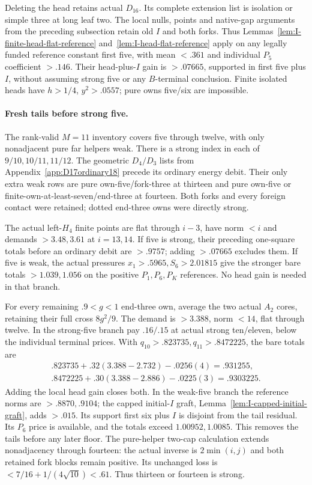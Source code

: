 \documentclass[11pt]{article}
\theoremstyle{definition}
\theoremstyle{remark}
\begin{document}
Deleting the head retains actual \(D_{16}\). Its complete extension
list is isolation or simple three at long leaf two. The local nulls,
points and native-gap arguments from the preceding subsection retain
old \(I\) and both forks. Thus Lemmas~\ref{lem:I-finite-head-flat-reference}
and~\ref{lem:I-head-flat-reference} apply on any legally funded
reference constant first five, with mean \(<.361\) and individual
\(P_5\) coefficient \(>.146\). Their head-plus-\(I\) gain is
\(>.07665\), supported in first five plus \(I\), without assuming
strong five or any \(B\)-terminal conclusion. Finite isolated heads
have \(h>1/4\), \(y^2>.0557\); pure owns five/six are impossible.

\paragraph{Fresh tails before strong five.}
The rank-valid \(M=11\) inventory covers five through twelve, with
only nonadjacent pure far helpers weak. There is a strong index in
each of \(9/10,10/11,11/12\). The geometric \(D_4/D_3\) lists
from Appendix~\ref{app:D17ordinary18} precede its ordinary energy
debit. Their only extra weak rows are pure own-five/fork-three at
thirteen and pure own-five or finite-own-at-least-seven/end-three
at fourteen. Both forks and every foreign contact were retained;
dotted end-three owns were directly strong.

The actual left-\(H_4\) finite points are flat through \(i-3\),
have norm \(<i\) and demands \(>3.48,3.61\) at \(i=13,14\).
If five is strong, their preceding one-square totals before an
ordinary debit are \(>.9757\); adding \(>.07665\) excludes them.
If five is weak, the actual pressures \(x_1>.5965,S_6>2.01815\)
give the stronger bare totals \(>1.039,1.056\) on the positive
\(P_1,P_6,P_K\) references. No head gain is needed in that branch.

For every remaining \(.9<g<1\) end-three own, average the two
actual \(A_2\) cores, retaining their full cross \(8g^2/9\).
The demand is \(>3.388\), norm \(<14\), flat through twelve.
In the strong-five branch pay \(.16/.15\) at actual strong ten/eleven,
below the individual terminal prices. With
\(q_{10}>.823735,q_{11}>.8472225\), the bare totals are
\[
\begin{gathered}
 .823735+.32(3.388-2.732)-.0256(4)=.931255,\\
 .8472225+.30(3.388-2.886)-.0225(3)=.9303225.
\end{gathered}
\]
Adding the local head gain closes both. In the weak-five branch the
reference norms are \(>.8870,.9104\); the capped initial-\(I\)
graft, Lemma~\ref{lem:I-capped-initial-graft}, adds \(>.015\).
Its support first six plus \(I\) is disjoint from the tail residual.
Its \(P_6\) price is available, and the totals exceed
\(1.00952,1.0085\). This removes the tails before any later floor.
The pure-helper two-cap calculation extends nonadjacency through
fourteen: the actual inverse is \(2\min(i,j)\) and both retained
fork blocks remain positive. Its unchanged loss is
\(<7/16+1/(4\sqrt{10})<.61\). Thus thirteen or fourteen is strong.
\end{document}
